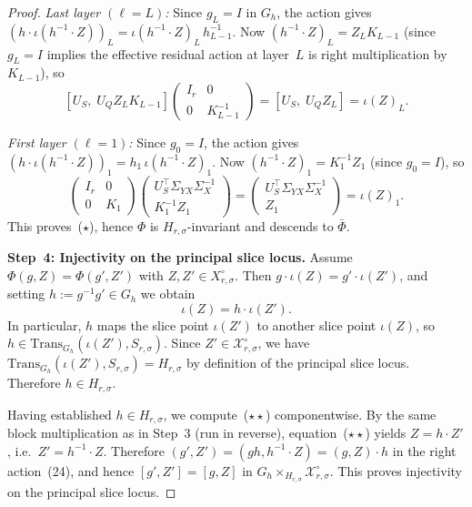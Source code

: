 \documentclass{article}
\theoremstyle{definition}
\begin{document}
\begin{proof}
\emph{Last layer $(\ell = L)$:}  Since $g_L = I$ in $G_h$, the action gives $(h \cdot \iota(h^{-1} \cdot Z))_L = \iota(h^{-1} \cdot Z)_L \, h_{L-1}^{-1}$.  Now $(h^{-1} \cdot Z)_L = Z_L K_{L-1}$ (since $g_L = I$ implies the effective residual action at layer~$L$ is right multiplication by $K_{L-1}$), so
\[
[U_S,\; U_Q Z_L K_{L-1}]
\begin{pmatrix} I_r & 0 \\ 0 & K_{L-1}^{-1} \end{pmatrix}
= [U_S,\; U_Q Z_L] = \iota(Z)_L.
\]

\emph{First layer $(\ell = 1)$:}  Since $g_0 = I$, the action gives $(h \cdot \iota(h^{-1} \cdot Z))_1 = h_1 \, \iota(h^{-1} \cdot Z)_1$.  Now $(h^{-1} \cdot Z)_1 = K_1^{-1} Z_1$ (since $g_0 = I$), so
\[
\begin{pmatrix} I_r & 0 \\ 0 & K_1 \end{pmatrix}
\begin{pmatrix} U_S^\top \Sigma_{YX} \Sigma_X^{-1} \\ K_1^{-1} Z_1 \end{pmatrix}
= \begin{pmatrix} U_S^\top \Sigma_{YX} \Sigma_X^{-1} \\ Z_1 \end{pmatrix}
= \iota(Z)_1.
\]
This proves~($\star$), hence $\Phi$ is $H_{r,\sigma}$-invariant and descends to $\bar\Phi$.

\medskip
\textbf{Step~4: Injectivity on the principal slice locus.}
Assume $\Phi(g, Z) = \Phi(g', Z')$ with $Z, Z' \in X_{r,\sigma}^{\circ}$.  Then $g \cdot \iota(Z) = g' \cdot \iota(Z')$, and setting $h := g^{-1} g' \in G_h$ we obtain
\begin{equation}\tag{$\star\star$}
\iota(Z) = h \cdot \iota(Z').
\end{equation}
In particular, $h$ maps the slice point $\iota(Z')$ to another slice point $\iota(Z)$, so $h \in \mathrm{Trans}_{G_h}(\iota(Z'), S_{r,\sigma})$.  Since $Z' \in  \mathcal X_{r,\sigma}^{\circ}$, we have $\mathrm{Trans}_{G_h}(\iota(Z'), S_{r,\sigma}) = H_{r,\sigma}$ by definition of the principal slice locus.  Therefore $h \in H_{r,\sigma}$.

Having established $h \in H_{r,\sigma}$, we compute~($\star\star$) componentwise.  By the same block multiplication as in Step~3 (run in reverse), equation~($\star\star$) yields $Z = h \cdot Z'$, i.e.\ $Z' = h^{-1} \cdot Z$.  Therefore $(g', Z') = (gh, h^{-1} \cdot Z) = (g, Z) \cdot h$ in the right action~(24), and hence $[g', Z'] = [g, Z]$ in $G_h \times_{H_{r,\sigma}} \mathcal X_{r,\sigma}^{\circ}$.  This proves injectivity on the principal slice locus.


\end{proof}
\end{document}
